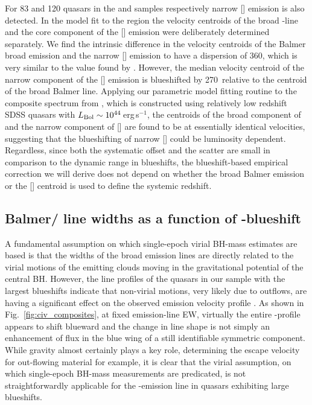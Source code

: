 For 83 and 120 quasars in the \ha and \hb samples respectively narrow [] emission is also detected. 
In the model fit to the \hb region the velocity centroids of the broad \hbns-line and the core component of the [] emission were deliberately determined separately.
We find the intrinsic difference in the velocity centroids of the Balmer broad emission and the narrow [] emission to have a dispersion of 360\kms, which is very similar to the value found by \citet{shen16b}. 
However, the median velocity centroid of the narrow component of the [] emission is blueshifted by 270\kms\, relative to the centroid of the broad Balmer line. 
Applying our parametric model fitting routine to the composite spectrum from \citet{hewett10}, which is constructed using relatively low redshift SDSS quasars with $L_{\rm Bol}\sim10^{44}$\,erg\,s$^{-1}$, the centroids of the broad component of \hb and the narrow component of [] are found to be at essentially identical velocities, suggesting that the blueshifting of narrow [] could be luminosity dependent.
Regardless, since both the systematic offset and the scatter are small in comparison to the dynamic range in  blueshifts, the blueshift-based empirical correction we will derive does not depend on whether the broad Balmer emission or the [] centroid is used to define the systemic redshift. 

\subsection{Balmer/ line widths as a function of -blueshift}
\label{sec:correction}

A fundamental assumption on which single-epoch virial BH-mass estimates are based is that the widths of the broad emission lines are directly related to the virial motions of the emitting clouds moving in the gravitational potential of the central BH. 
However, the  line profiles of the quasars in our sample with the largest  blueshifts indicate that non-virial motions, very likely due to outflows, are having a significant effect on the observed  emission velocity profile \citep[e.g.][]{gaskell82,baskin05,sulentic07,richards11,wang13}.  
As shown in Fig.~\ref{fig:civ_composites}, at fixed emission-line EW, virtually the entire -profile appears to shift blueward and the change in line shape is not simply an enhancement of flux in the blue wing of a still identifiable symmetric component. 
While gravity almost certainly plays a key role, determining the escape velocity for out-flowing material for example, it is clear that the virial assumption, on which single-epoch BH-mass measurements are predicated, is not straightforwardly applicable for the -emission line in quasars exhibiting large blueshifts. 

